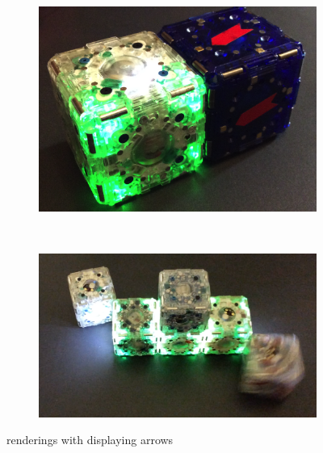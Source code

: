\begin{figure}[t]
	\centering
	\begin{subfigure}[b]{1.6 in}
			\includegraphics[width=.9\linewidth]{Figures/mTagsCover.png}
		\subcaption{}
	\end{subfigure}
	~
	\begin{subfigure}[b]{1.5 in}


		\resizebox{1.5 in}{1.25 in}
		{
			\begin{tikzpicture}[x=(220:1cm), y=(-40:1cm), z=(90:0.707cm)]
			
			
			
			\end{tikzpicture}
		}

			\subcaption{}
	\end{subfigure}
	
	\centering
	\begin{subfigure}[b]{\linewidth}
		\includegraphics[width=.95\linewidth]{figures/ActualLine_3.png}
	\end{subfigure}


	\caption{\tagNamePlural renderings with displaying arrows}

	\label{fig:PlaneChanging2}
\end{figure}

